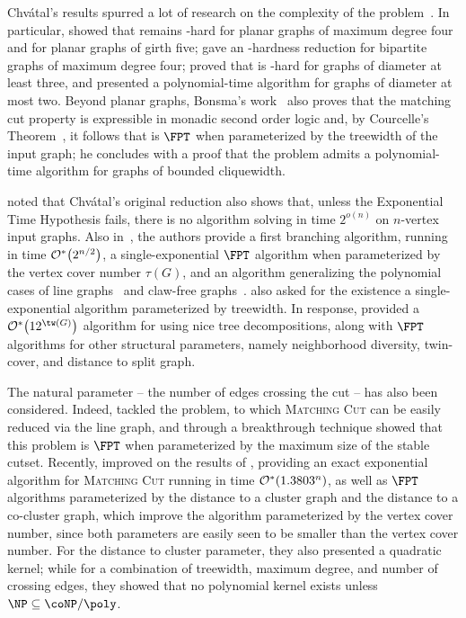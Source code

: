 Chvátal's results spurred a lot of research on the complexity of the problem~\citep{matching_cut_ipec,matching_cut_structural,matching_cut_tcs, matching_cut_diameter, matching_cut_planar, matching_cut_series_parallel, stable_cutset_line_graphs}.
In particular, \cite{matching_cut_planar} showed that  remains \NP-hard for planar graphs of maximum degree four and for planar graphs of girth five;
\cite{stable_cutset_line_graphs} gave an \NP-hardness reduction for bipartite graphs of maximum degree four;
\cite{matching_cut_diameter} proved that  is \NP-hard for graphs of diameter at least three, and presented a polynomial-time algorithm for graphs of diameter at most two.
Beyond planar graphs, Bonsma's work~\citep{matching_cut_planar} also proves that the matching cut property is expressible in monadic second order logic and, by Courcelle's Theorem~\citep{courcelle_theorem}, it follows that  is $\FPT$ when parameterized by the treewidth of the input graph; he concludes with a proof that the problem admits a polynomial-time algorithm for graphs of bounded cliquewidth.

\cite{matching_cut_tcs} noted that Chv\'atal's original reduction also shows that, unless the Exponential Time Hypothesis fails, there is no algorithm solving  in time $2^{o(n)}$ on $n$-vertex input graphs.
Also in~\citep{matching_cut_tcs}, the authors provide a first branching algorithm, running in time $\mathcal{O}^*\!\left(2^{n/2}\right)$, a single-exponential $\FPT$ algorithm when parameterized by the vertex cover number $\tau(G)$, and an algorithm generalizing the polynomial cases of line graphs~\citep{matching_cut_moshi} and claw-free graphs~\citep{matching_cut_planar}.
\cite{matching_cut_tcs} also asked for the existence a single-exponential algorithm parameterized by treewidth.
In response, \cite{matching_cut_structural} provided a $\bigOs{12^{\tw(G)}}$ algorithm for  using nice tree decompositions, along with $\FPT$ algorithms for other structural parameters, namely neighborhood diversity, twin-cover, and distance to split graph.

The natural parameter -- the number of edges crossing the cut -- has also been considered.
Indeed, \cite{marx_treewidth_reduction} tackled the  problem, to which \textsc{Matching Cut} can be easily reduced via the line graph, and through a breakthrough technique showed that this problem is $\FPT$ when parameterized by the maximum size of the stable cutset.
Recently, \cite{matching_cut_ipec} improved on the results of \cite{matching_cut_tcs}, providing an exact exponential algorithm for \textsc{Matching Cut} running in  time $\mathcal{O}^*\!\left(1.3803^n\right)$, as well as $\FPT$ algorithms parameterized by the distance to a cluster graph and the distance to a co-cluster graph, which improve the algorithm parameterized by the vertex cover number, since both parameters are easily seen to be smaller than the vertex cover number.
For the distance to cluster parameter, they also presented a quadratic kernel; while for a combination of treewidth, maximum degree, and number of crossing edges, they showed that no polynomial kernel exists unless $\NP \subseteq \coNP/\poly$.

